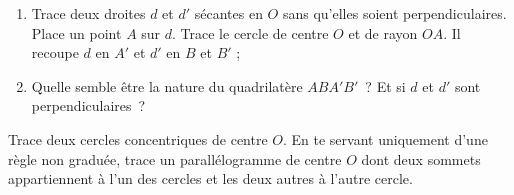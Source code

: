 \begin{exercice}
 \begin{enumerate}
  \item Trace deux droites $d$ et $d'$ sécantes en $O$ sans qu'elles soient perpendiculaires. Place un point $A$ sur $d$. Trace le cercle de centre $O$ et de rayon $OA$. Il recoupe $d$ en $A'$ et $d'$ en $B$ et $B'$ ;
  \item Quelle semble être la nature du quadrilatère $ABA'B'$ ? Et si $d$ et $d'$ sont perpendiculaires ?
  \end{enumerate}
\end{exercice}


\begin{exercice}
\vspace{1em}
Trace deux cercles concentriques de centre $O$. En te servant uniquement d'une règle non graduée, trace un parallélogramme de centre $O$ dont deux sommets appartiennent à l'un des cercles et les deux autres à l'autre cercle.
\end{exercice}


